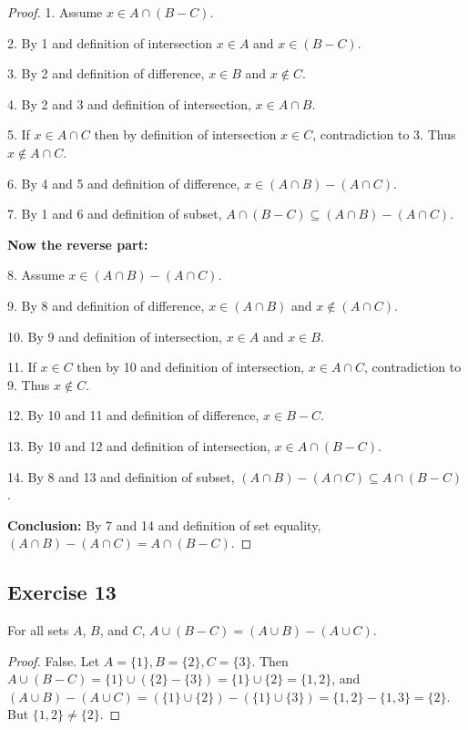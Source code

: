 \documentclass[14pt]{extarticle}
\begin{document}
\begin{proof}
  1. Assume \(x \in A \cap (B - C)\).

  2. By 1 and definition of intersection \(x \in A\) and \(x \in (B - C)\).

  3. By 2 and definition of difference, \(x \in B\) and \(x \notin C\).

  4. By 2 and 3 and definition of intersection, \(x \in A \cap B\).

  5. If \(x \in A \cap C\) then by definition of intersection \(x \in C\), contradiction to 3. Thus \(x \notin A \cap C\).

  6. By 4 and 5 and definition of difference, \(x \in (A \cap B) - (A \cap C)\).

  7. By 1 and 6 and definition of subset, \(A \cap (B - C) \subseteq (A \cap B) - (A \cap C)\).

    {\bf Now the reverse part:}

  8. Assume \(x \in (A \cap B) - (A \cap C)\).

  9. By 8 and definition of difference, \(x \in (A \cap B)\) and \(x \notin (A \cap C)\).

  10. By 9 and definition of intersection, \(x \in A\) and \(x \in B\).

  11. If \(x \in C\) then by 10 and definition of intersection, \(x \in A \cap C\), contradiction to 9.
  Thus \(x \notin C\).

  12. By 10 and 11 and definition of difference, \(x \in B - C\).

  13. By 10 and 12 and definition of intersection, \(x \in A \cap (B - C)\).

  14. By 8 and 13 and definition of subset, \((A \cap B) - (A \cap C) \subseteq A \cap (B - C)\).

    {\bf Conclusion:} By 7 and 14 and definition of set equality, \((A \cap B) - (A \cap C) = A \cap (B - C)\).
\end{proof}

\subsection{Exercise 13}
For all sets $A$, $B$, and $C$, \(A \cup (B - C) = (A \cup B) - (A \cup C)\).

\begin{proof}
  False. Let \(A = \{1\}, B = \{2\}, C = \{3\}\). Then \(A \cup (B - C) = \{1\} \cup (\{2\} - \{3\}) = \{1\} \cup
  \{2\} = \{1, 2\}\), and \((A \cup B) - (A \cup C) = (\{1\} \cup \{2\}) - (\{1\} \cup \{3\}) = \{1, 2\} - \{1, 3\} =
  \{2\}\). But \(\{1, 2\} \neq \{2\}\).
\end{proof}
\end{document}
